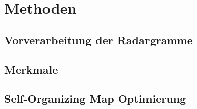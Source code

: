 \section{Methoden}

\subsection{Vorverarbeitung der Radargramme}
\lipsum[1-4]
\cite{barnes_too-many_nodate}
\lipsum[1]
\cite{steiger_2d-cmap_2015}
\lipsum[1-3]

\subsection{Merkmale}
\lipsum[1-8]

\subsection{Self-Organizing Map Optimierung}
\lipsum[1-5]
